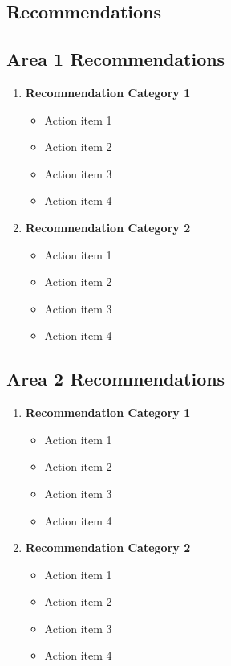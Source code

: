 \documentclass[10pt,a4paper]{article}
\begin{document}
\begin{multicols}{2}
\section*{Recommendations}

\subsection*{Area 1 Recommendations}
\begin{enumerate}\small
  \item \textbf{Recommendation Category 1}
    \begin{itemize}
      \item Action item 1
      \item Action item 2
      \item Action item 3
      \item Action item 4
    \end{itemize}
  
  \item \textbf{Recommendation Category 2}
    \begin{itemize}
      \item Action item 1
      \item Action item 2
      \item Action item 3
      \item Action item 4
    \end{itemize}
\end{enumerate}

\subsection*{Area 2 Recommendations}
\begin{enumerate}\small
  \item \textbf{Recommendation Category 1}
    \begin{itemize}
      \item Action item 1
      \item Action item 2
      \item Action item 3
      \item Action item 4
    \end{itemize}
  
  \item \textbf{Recommendation Category 2}
    \begin{itemize}
      \item Action item 1
      \item Action item 2
      \item Action item 3
      \item Action item 4
    \end{itemize}
\end{enumerate}


\end{multicols}
\end{document}
